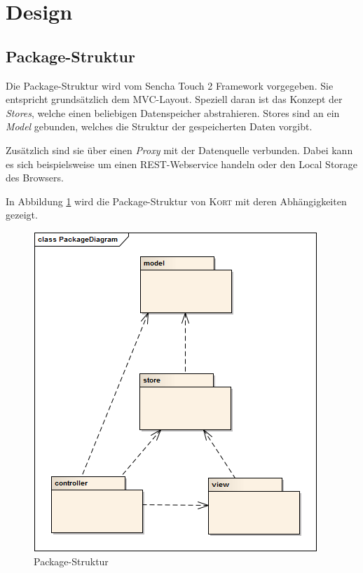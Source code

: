 \section{Design}

\subsection{Package-Struktur}

Die Package-Struktur wird vom Sencha Touch 2 Framework vorgegeben. Sie entspricht grundsätzlich dem MVC-Layout.
Speziell daran ist das Konzept der \emph{Stores}, welche einen beliebigen Datenspeicher abstrahieren.
Stores sind an ein \emph{Model} gebunden, welches die Struktur der gespeicherten Daten vorgibt.

Zusätzlich sind sie über einen \emph{Proxy} mit der Datenquelle verbunden.
Dabei kann es sich beispielsweise um einen \gls{REST}-Webservice handeln oder den \gls{Local Storage} des Browsers.

In Abbildung \ref{image-kort-packagediagram} wird die Package-Struktur von \textsc{Kort} mit deren Abhängigkeiten gezeigt.

\begin{figure}[H]
	\centering
	\includegraphics[scale=0.7]{images/uml/kort-packagediagram}
	\caption{Package-Struktur}
	\label{image-kort-packagediagram}
\end{figure}

